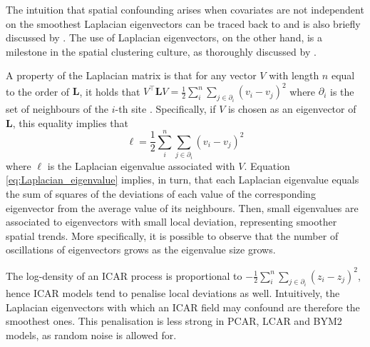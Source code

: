 \documentclass[openany, 11pt, oneside]{book}
\begin{document}
The intuition that spatial confounding arises when covariates are not independent on the smoothest Laplacian eigenvectors can be traced back to \cite{RHZ} and is also briefly discussed by \cite{Khan}. The use of Laplacian eigenvectors, on the other hand, is a milestone in the spatial clustering culture, as thoroughly discussed by \cite{SpectralClust}. 

A property of the Laplacian matrix is that for any vector $V$ with length $n$ equal to the order of $\boldsymbol{L}$, it holds that $V^\top \boldsymbol{L}V =\frac{1}{2} \sum_{i}^{n} \sum_{j \in \partial_i}\left(v_i - v_j \right)^2$ where $\partial_i$ is the set of neighbours of the $i$-th site \parencite[see, e.g.][]{SpectralClust}. Specifically, if $V$ is chosen as an eigenvector of $\boldsymbol{L}$, this equality implies that 
\begin{equation}
\ell = \frac{1}{2}\sum_{i}^{n} \sum_{j \in \partial_i}\left(v_i - v_j \right)^2
\label{eq:Laplacian_eigenvalue}
\end{equation}
where $\ell$ is the Laplacian eigenvalue associated with $V$. Equation \ref{eq:Laplacian_eigenvalue} implies, in turn, that each Laplacian eigenvalue equals the sum of squares of the deviations of each value of the corresponding eigenvector from the average value of its neighbours. Then, small eigenvalues are associated to eigenvectors with small local deviation, representing smoother spatial trends. More specifically, it is possible to observe that the number of oscillations of eigenvectors grows as the eigenvalue size grows. 

The log-density of an ICAR process is proportional to $- \frac{1}{2}\sum_{i}^{n} \sum_{j \in \partial_i}\left(z_i - z_j \right)^2$, hence ICAR models tend to penalise local deviations as well. Intuitively, the Laplacian eigenvectors with which an ICAR field may confound are therefore the smoothest ones. This penalisation is less strong in PCAR, LCAR and BYM2 models, as random noise is allowed for.
\end{document}
